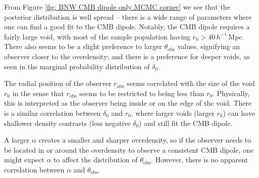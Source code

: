 \documentclass[a4paper,12pt]{report}
\begin{document}
From Figure \ref{fig: BNW CMB dipole only MCMC corner} we see that the posterior distribution is well spread -- there is a wide range of parameters where one can find a good fit to the CMB dipole. Notably, the CMB dipole requires a fairly large void, with most of the sample population having $r_0 > 40\, h^{-1}\,$Mpc. There also seems to be a slight preference to larger $\theta_{\text{obs}}$ values, signifying an observer closer to the overdensity; and there is a preference for deeper voids, as seen in the marginal probability distribution of $\delta_0$.

The radial position of the observer $r_\text{obs}$ seems correlated with the size of the void $r_0$ in the sense that $r_\text{obs}$ seems to be restricted to being less than $r_0$. Physically, this is interpreted as the observer being inside or on the edge of the void. There is a similar correlation between $\delta_0$ and $r_0$, where larger voids (larger $r_0$) can have shallower density contrasts (less negative $\delta_0$) and still fit the CMB dipole.

A larger $\alpha$ creates a smaller and sharper overdensity, so if the observer needs to be located in or around the overdensity to observe a consistent CMB dipole, one might expect $\alpha$ to affect the distribution of $\theta_\text{obs}$. However, there is no apparent correlation between $\alpha$ and $\theta_\text{obs}$.
\end{document}
